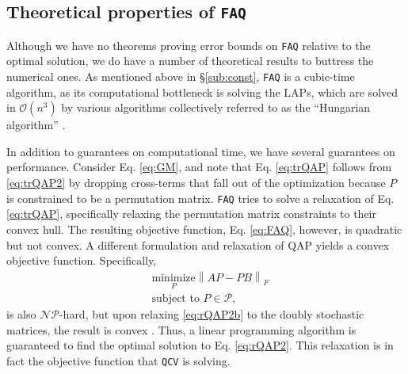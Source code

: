 \documentclass[11pt]{article}
\providecommand{\norm}[1]{\left \lVert#1 \right  \rVert}
\providecommand{\mc}[1]{\mathcal{#1}}
\newcommand{\FAQ}{\texttt{FAQ} }
\begin{document}
% 


\subsection{Theoretical properties of \FAQ} %
\label{sub:rqap_solves_qap_}

Although we have no theorems proving error bounds on \texttt{FAQ} relative to the optimal solution, we do have a number of theoretical results to buttress the numerical ones.  As mentioned above in \S \ref{sub:const}, \FAQ is a cubic-time algorithm, as its computational bottleneck is solving the LAPs, which are solved in $\mc{O}(n^3)$ by various algorithms collectively referred to as the ``Hungarian algorithm'' \cite{Jonker1987, Burkard2009}.   

In addition to guarantees on computational time, we have several guarantees on performance.  Consider Eq. \eqref{eq:GM}, and note that Eq. \eqref{eq:trQAP} follows from \eqref{eq:trQAP2} by 
% 
% 
dropping cross-terms that fall out of the optimization because $P$ is constrained to be a permutation matrix.  \FAQ tries to solve a relaxation of Eq. \eqref{eq:trQAP}, specifically relaxing the permutation matrix constraints to their convex hull.  The resulting objective function, Eq. \eqref{eq:FAQ}, however, is quadratic but not convex.  A different formulation and relaxation of QAP yields a convex objective function. Specifically,
\begin{subequations} \label{eq:rQAP2}
\begin{align} 
		&\underset{P}{\text{minimize}} 		\norm{AP - PB}_F   \label{eq:rQAP2a}\\
		&\text{subject to } 	 P \in \mc{P}, \label{eq:rQAP2b}
\end{align}
\end{subequations}
is also $\mc{NP}$-hard, but upon relaxing \eqref{eq:rQAP2b} to the doubly stochastic matrices, the result is convex \cite{Almohamad1993}.  Thus, a linear programming algorithm is guaranteed to find the optimal solution to Eq. \eqref{eq:rQAP2}.  This relaxation is in fact the objective function that \texttt{QCV} is solving.  
\end{document}
